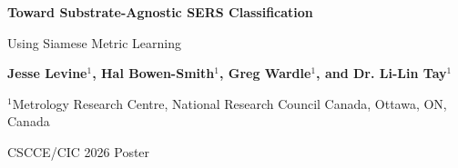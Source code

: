 \documentclass[final]{article}
\newcommand{\bodytext}{\fontsize{16.8}{20.0}\selectfont}
\begin{document}
\bodytext\color{textblack}

\noindent
\colorbox{pagecream}{%
  \begin{minipage}[t][1.75in][c]{0.585\linewidth}
  {\fontsize{48}{52}\selectfont\bfseries Toward Substrate-Agnostic SERS Classification}\par
  {\fontsize{36}{41}\selectfont Using Siamese Metric Learning}
  \end{minipage}%
}
\hfill
\colorbox{templatedark}{%
  \begin{minipage}[t][1.75in][c]{0.385\linewidth}
  \raggedleft\color{white}
  {\fontsize{26.5}{30.5}\selectfont\bfseries Jesse Levine$^{1}$, Hal Bowen-Smith$^{1}$, Greg Wardle$^{1}$, and Dr. Li-Lin Tay$^{1}$}\par
  \vspace{0.08in}
  {\fontsize{18}{22}\selectfont $^{1}$Metrology Research Centre, National Research Council Canada, Ottawa, ON, Canada}\par
  \vspace{0.08in}
  {\fontsize{16}{19}\selectfont CSCCE/CIC 2026 Poster}
  \end{minipage}%
}

\vspace{0.14in}
\end{document}
